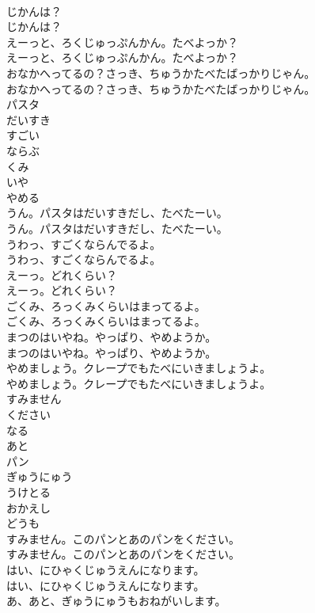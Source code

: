 \documentclass[8pt]{extreport}
\begin{document}
\begin{CJK}{UTF8}{min}
\\	じかんは？
\\	じかんは？
\\	えーっと、ろくじゅっぷんかん。たべよっか？
\\	えーっと、ろくじゅっぷんかん。たべよっか？
\\	おなかへってるの？さっき、ちゅうかたべたばっかりじゃん。
\\	おなかへってるの？さっき、ちゅうかたべたばっかりじゃん。
\\	パスタ
\\	だいすき
\\	すごい
\\	ならぶ
\\	くみ
\\	いや
\\	やめる
\\	うん。パスタはだいすきだし、たべたーい。
\\	うん。パスタはだいすきだし、たべたーい。
\\	うわっ、すごくならんでるよ。
\\	うわっ、すごくならんでるよ。
\\	えーっ。どれくらい？
\\	えーっ。どれくらい？
\\	ごくみ、ろっくみくらいはまってるよ。
\\	ごくみ、ろっくみくらいはまってるよ。
\\	まつのはいやね。やっぱり、やめようか。
\\	まつのはいやね。やっぱり、やめようか。
\\	やめましょう。クレープでもたべにいきましょうよ。
\\	やめましょう。クレープでもたべにいきましょうよ。
\\	すみません
\\	ください
\\	なる
\\	あと
\\	パン
\\	ぎゅうにゅう
\\	うけとる
\\	おかえし
\\	どうも
\\	すみません。このパンとあのパンをください。
\\	すみません。このパンとあのパンをください。
\\	はい、にひゃくじゅうえんになります。
\\	はい、にひゃくじゅうえんになります。
\\	あ、あと、ぎゅうにゅうもおねがいします。

\end{CJK}
\end{document}
